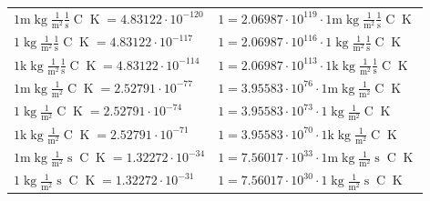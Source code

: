 \begin{center}
\begin{longtable}{l l}
{\color{gray}$1 \bm{\mathrm{ m}}\operatorname{kg}\frac1{\operatorname{m}^2}\frac1{\operatorname{s}}{\operatorname{C}}{\operatorname{K}} = 4.83122\cdot10^{-120} $}   & {\color{gray}$ 1 = 2.06987\cdot10^{119} \cdot 1 \bm{\mathrm{ m}}\operatorname{kg}\frac1{\operatorname{m}^2}\frac1{\operatorname{s}}{\operatorname{C}}{\operatorname{K}}$}  \\
{\color{black}$1 \bm{\mathrm{ }}\operatorname{kg}\frac1{\operatorname{m}^2}\frac1{\operatorname{s}}{\operatorname{C}}{\operatorname{K}} = 4.83122\cdot10^{-117} $}   & {\color{black}$ 1 = 2.06987\cdot10^{116} \cdot 1 \bm{\mathrm{ }}\operatorname{kg}\frac1{\operatorname{m}^2}\frac1{\operatorname{s}}{\operatorname{C}}{\operatorname{K}}$}  \\
{\color{gray}$1 \bm{\mathrm{ k}}\operatorname{kg}\frac1{\operatorname{m}^2}\frac1{\operatorname{s}}{\operatorname{C}}{\operatorname{K}} = 4.83122\cdot10^{-114} $}   & {\color{gray}$ 1 = 2.06987\cdot10^{113} \cdot 1 \bm{\mathrm{ k}}\operatorname{kg}\frac1{\operatorname{m}^2}\frac1{\operatorname{s}}{\operatorname{C}}{\operatorname{K}}$}  \\
{\color{gray}$1 \bm{\mathrm{ m}}\operatorname{kg}\frac1{\operatorname{m}^2}{}{\operatorname{C}}{\operatorname{K}} = 2.52791\cdot10^{-77} $}   & {\color{gray}$ 1 = 3.95583\cdot10^{76} \cdot 1 \bm{\mathrm{ m}}\operatorname{kg}\frac1{\operatorname{m}^2}{}{\operatorname{C}}{\operatorname{K}}$}  \\
{\color{black}$1 \bm{\mathrm{ }}\operatorname{kg}\frac1{\operatorname{m}^2}{}{\operatorname{C}}{\operatorname{K}} = 2.52791\cdot10^{-74} $}   & {\color{black}$ 1 = 3.95583\cdot10^{73} \cdot 1 \bm{\mathrm{ }}\operatorname{kg}\frac1{\operatorname{m}^2}{}{\operatorname{C}}{\operatorname{K}}$}  \\
{\color{gray}$1 \bm{\mathrm{ k}}\operatorname{kg}\frac1{\operatorname{m}^2}{}{\operatorname{C}}{\operatorname{K}} = 2.52791\cdot10^{-71} $}   & {\color{gray}$ 1 = 3.95583\cdot10^{70} \cdot 1 \bm{\mathrm{ k}}\operatorname{kg}\frac1{\operatorname{m}^2}{}{\operatorname{C}}{\operatorname{K}}$}  \\
{\color{gray}$1 \bm{\mathrm{ m}}\operatorname{kg}\frac1{\operatorname{m}^2}{\operatorname{s}}{\operatorname{C}}{\operatorname{K}} = 1.32272\cdot10^{-34} $}   & {\color{gray}$ 1 = 7.56017\cdot10^{33} \cdot 1 \bm{\mathrm{ m}}\operatorname{kg}\frac1{\operatorname{m}^2}{\operatorname{s}}{\operatorname{C}}{\operatorname{K}}$}  \\
{\color{black}$1 \bm{\mathrm{ }}\operatorname{kg}\frac1{\operatorname{m}^2}{\operatorname{s}}{\operatorname{C}}{\operatorname{K}} = 1.32272\cdot10^{-31} $}   & {\color{black}$ 1 = 7.56017\cdot10^{30} \cdot 1 \bm{\mathrm{ }}\operatorname{kg}\frac1{\operatorname{m}^2}{\operatorname{s}}{\operatorname{C}}{\operatorname{K}}$}  \\

\end{longtable}
\end{center}

